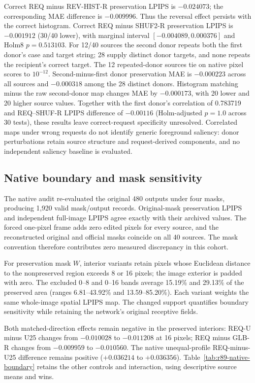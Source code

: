 \documentclass[10pt,doubleanonymous]{ieeeconf}
\begin{document}
Correct REQ minus REV-HIST-R preservation LPIPS is $-0.024073$; the corresponding MAE difference is $-0.009996$. Thus the reversal effect persists with the correct histogram. Correct REQ minus SHUF2-R preservation LPIPS is $-0.001912$ (30/40 lower), with marginal interval $[-0.004089,0.000376]$ and Holm8 $p=0.513103$. For 12/40 sources the second donor repeats both the first donor's case and target string; 28 supply distinct donor targets, and none repeats the recipient's correct target. The 12 repeated-donor sources tie on native pixel scores to $10^{-12}$. Second-minus-first donor preservation MAE is $-0.000223$ across all sources and $-0.000318$ among the 28 distinct donors. Histogram matching minus the raw second-donor map changes MAE by $-0.000173$, with 20 lower and 20 higher source values. Together with the first donor's correlation of 0.783719 and REQ--SHUF-R LPIPS difference of $-0.00116$ (Holm-adjusted $p=1.0$ across 30 tests), these results leave correct-request specificity unresolved. Correlated maps under wrong requests do not identify generic foreground saliency: donor perturbations retain source structure and request-derived components, and no independent saliency baseline is evaluated.

\subsection{Native boundary and mask sensitivity}
The native audit re-evaluated the original 480 outputs under four masks, producing 1,920 valid mask/output records. Original-mask preservation LPIPS and independent full-image LPIPS agree exactly with their archived values. The forced one-pixel frame adds zero edited pixels for every source, and the reconstructed original and official masks coincide on all 40 sources. The mask convention therefore contributes zero measured discrepancy in this cohort.

For preservation mask $W$, interior variants retain pixels whose Euclidean distance to the nonpreserved region exceeds 8 or 16 pixels; the image exterior is padded with zero. The excluded 0--8 and 0--16 bands average 15.19\% and 29.13\% of the preserved area (ranges 6.81--43.92\% and 13.59--85.20\%). Each variant weights the same whole-image spatial LPIPS map. The changed support quantifies boundary sensitivity while retaining the network's original receptive fields.



Both matched-direction effects remain negative in the preserved interiors: REQ-U minus U25 changes from $-0.010028$ to $-0.011208$ at 16 pixels; REQ minus GLB-R changes from $-0.009959$ to $-0.010560$. The native unequal-profile REQ-minus-U25 difference remains positive ($+0.036214$ to $+0.036356$). Table~\ref{tab:r89-native-boundary} retains the other controls and interaction, using descriptive source means and wins.
\end{document}
